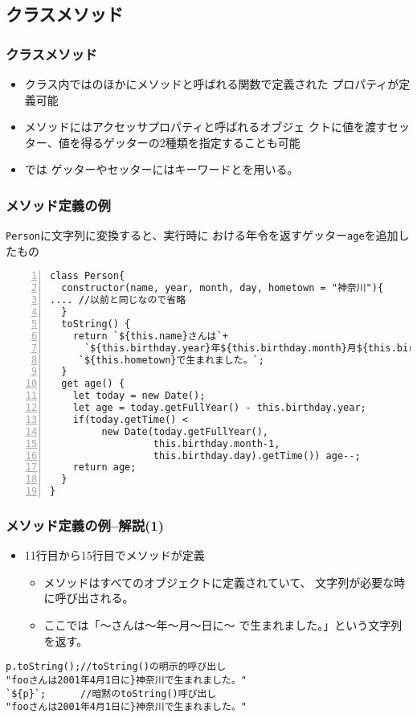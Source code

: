 \subsection{クラスメソッド}
\begin{frame}[containsverbatim]
 \frametitle{クラスメソッド}
\begin{itemize}
 \item クラス内ではのほかにメソッドと呼ばれる関数で定義された
プロパティが定義可能
 \item メソッドにはアクセッサプロパティと呼ばれるオブジェ
クトに値を渡すセッター、値を得るゲッターの2種類を指定することも可能
 \item \ES では
ゲッターやセッターにはキーワードとを用いる。
\end{itemize} 
 \end{frame}
\begin{frame}[containsverbatim]
 \frametitle{メソッド定義の例}
\texttt{Person}に文字列に変換すると、実行時に
 おける年令を返すゲッター\texttt{age}を追加したもの
 {\scriptsize
\begin{Verbatim}[numbers=left,fontsize=\footnotesize]
class Person{
  constructor(name, year, month, day, hometown = "神奈川"){
.... //以前と同じなので省略
  }
  toString() {
    return `${this.name}さんは`+
      `${this.birthday.year}年${this.birthday.month}月${this.birthday.day}日に` +
     `${this.hometown}で生まれました。`;
  }
  get age() {
    let today = new Date();
    let age = today.getFullYear() - this.birthday.year;
    if(today.getTime() <
         new Date(today.getFullYear(),
                  this.birthday.month-1,
                  this.birthday.day).getTime()) age--;
    return age;
  }
}
\end{Verbatim}
 }
\end{frame}
\begin{frame}[containsverbatim]
 \frametitle{メソッド定義の例--解説(1)}
 \begin{itemize}
  \item 11行目から15行目でメソッドが定義
        \begin{itemize}
         \item {}メソッドはすべてのオブジェクトに定義されていて、
 文字列が必要な時に呼び出される。
         \item ここでは「～さんは～年～月～日に～
               で生まれました。」という文字列を返す。
        \end{itemize}
 \end{itemize}
\begin{Verbatim}
p.toString();//toString()の明示的呼び出し
"fooさんは2001年4月1日に}神奈川で生まれました。"
`${p}`;      //暗黙のtoString()呼び出し
"fooさんは2001年4月1日に}神奈川で生まれました。"
\end{Verbatim}
 \end{frame}
